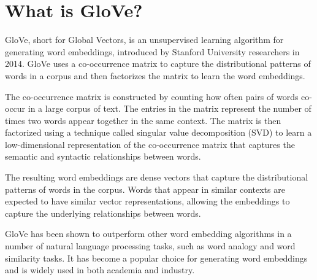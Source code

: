 \section{What is GloVe?}
GloVe, short for Global Vectors, is an unsupervised learning algorithm for generating word embeddings, introduced by Stanford University researchers in 2014. GloVe uses a co-occurrence matrix to capture the distributional patterns of words in a corpus and then factorizes the matrix to learn the word embeddings.

The co-occurrence matrix is constructed by counting how often pairs of words co-occur in a large corpus of text. The entries in the matrix represent the number of times two words appear together in the same context. The matrix is then factorized using a technique called singular value decomposition (SVD) to learn a low-dimensional representation of the co-occurrence matrix that captures the semantic and syntactic relationships between words.

The resulting word embeddings are dense vectors that capture the distributional patterns of words in the corpus. Words that appear in similar contexts are expected to have similar vector representations, allowing the embeddings to capture the underlying relationships between words.

GloVe has been shown to outperform other word embedding algorithms in a number of natural language processing tasks, such as word analogy and word similarity tasks. It has become a popular choice for generating word embeddings and is widely used in both academia and industry.

